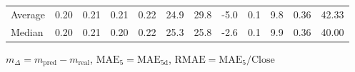 \begin{threeparttable}
{\begin{tabular}{lrrrrrrrrrrr}
Average &          0.20 &          0.21 &          0.21 &        0.22 &                24.9 &                29.8 &       -5.0 &                 0.1 &              9.8 &            0.36 &                  42.33 \\
 Median &          0.20 &          0.21 &          0.20 &        0.22 &                25.3 &                25.8 &       -2.6 &                 0.1 &              9.9 &            0.36 &                  40.00 \\
\bottomrule
\end{tabular}
}
\begin{tablenotes}\footnotesize
\item $m_\Delta=m_{\text{pred}}-m_{\text{real}}$,
$\mathrm{MAE}_5=\mathrm{MAE}_{5\text{d}}$,
$\mathrm{RMAE}=\mathrm{MAE}_5/\text{Close}$
\end{tablenotes}
\end{threeparttable}
\endgroup

